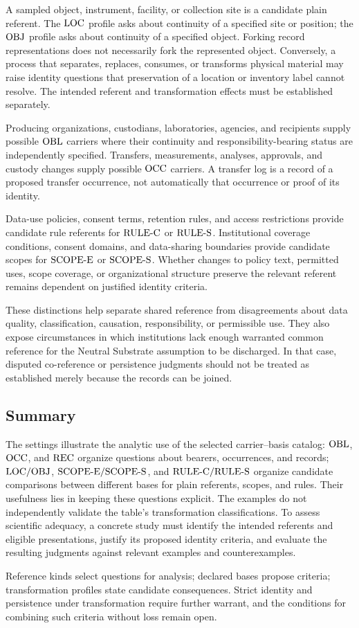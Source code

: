 A sampled object, instrument, facility, or collection site is a
candidate plain referent.
The $\mathrm{LOC}$ profile asks about continuity of
a specified site or position; the $\mathrm{OBJ}$ profile asks about continuity
of a specified object.
Forking record representations does not
necessarily fork the represented object.
Conversely, a process that
separates, replaces, consumes, or transforms physical material may
raise identity questions that preservation of a location or inventory
label cannot resolve.
The intended referent and transformation effects
must be established separately.

Producing organizations, custodians, laboratories, agencies, and
recipients supply possible $\mathrm{OBL}$ carriers where their continuity and
responsibility-bearing status are independently specified.
Transfers,
measurements, analyses, approvals, and custody changes supply possible
$\mathrm{OCC}$ carriers.
A transfer log is a record of a proposed transfer
occurrence, not automatically that occurrence or proof of its identity.

Data-use policies, consent terms, retention rules, and access
restrictions provide candidate rule referents for $\mathrm{RULE\text{-}C}$ or
$\mathrm{RULE\text{-}S}$.
Institutional coverage conditions, consent domains, and
data-sharing boundaries provide candidate scopes for $\mathrm{SCOPE\text{-}E}$ or
$\mathrm{SCOPE\text{-}S}$.
Whether changes to policy text, permitted uses, scope
coverage, or organizational structure preserve the relevant referent
remains dependent on justified identity criteria.

These distinctions help separate shared reference from disagreements
about data quality, classification, causation, responsibility, or
permissible use.
They also expose circumstances in which institutions
lack enough warranted common reference for the Neutral Substrate
assumption to be discharged.
In that case, disputed co-reference or
persistence judgments should not be treated as established merely
because the records can be joined.

\subsection{Summary}
\label{subsec:app_summary}

The settings illustrate the analytic use of the selected
carrier--basis catalog: $\mathrm{OBL}$, $\mathrm{OCC}$, and $\mathrm{REC}$ organize questions
about bearers, occurrences, and records; $\mathrm{LOC}/\mathrm{OBJ}$,
$\mathrm{SCOPE\text{-}E}/\mathrm{SCOPE\text{-}S}$, and $\mathrm{RULE\text{-}C}/\mathrm{RULE\text{-}S}$ organize candidate comparisons
between different bases for plain referents, scopes, and rules.
Their usefulness lies in keeping these questions explicit.
The examples do not independently validate the table's transformation
classifications.
To assess scientific adequacy, a concrete study must
identify the intended referents and eligible presentations, justify
its proposed identity criteria, and evaluate the resulting judgments
against relevant examples and counterexamples.

Reference kinds select questions for analysis; declared bases propose
criteria; transformation profiles state candidate consequences.
Strict identity and persistence under transformation require further
warrant, and the conditions for combining such criteria without loss
remain open.
